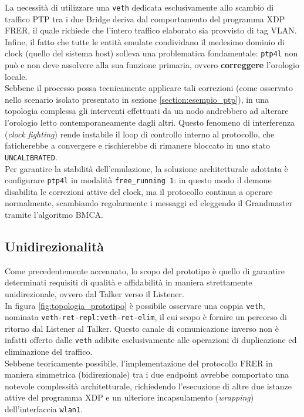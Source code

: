 \documentclass[12pt,a4paper,twoside]{book}
\begin{document}
\begin{onehalfspace}
La necessità di utilizzare una \texttt{veth} dedicata esclusivamente allo scambio di traffico PTP tra i due Bridge deriva dal comportamento del programma XDP FRER, il quale richiede che l'intero traffico elaborato sia provvisto di tag VLAN.
\\
Infine, il fatto che tutte le entità emulate condividano il medesimo dominio di clock (quello del sistema host) solleva una problematica fondamentale: \texttt{ptp4l} non può e non deve assolvere alla sua funzione primaria, ovvero \textbf{correggere} l'orologio locale. 
\\
Sebbene il processo possa tecnicamente applicare tali correzioni (come osservato nello scenario isolato presentato in sezione \ref{section:esempio_ptp}), in una topologia complessa gli interventi effettuati da un nodo andrebbero ad alterare l'orologio letto contemporaneamente dagli altri. Questo fenomeno di interferenza (\textit{clock fighting}) rende instabile il loop di controllo interno al protocollo, che faticherebbe a convergere e rischierebbe di rimanere bloccato in uno stato \texttt{UNCALIBRATED}. 
\\
Per garantire la stabilità dell'emulazione, la soluzione architetturale adottata è configurare \texttt{ptp4l} in modalità \texttt{free\_running 1}: in questo modo il demone disabilita le correzioni attive del clock, ma il protocollo continua a operare normalmente, scambiando regolarmente i messaggi ed eleggendo il Grandmaster tramite l'algoritmo BMCA.
\subsection{Unidirezionalità}
Come precedentemente accennato, lo scopo del prototipo è quello di garantire determinati requisiti di qualità e affidabilità in maniera strettamente unidirezionale, ovvero dal Talker verso il Listener.
\\
In figura \ref{fig:topologia_prototipo} è possibile osservare una coppia \texttt{veth}, nominata \texttt{veth\allowbreak-ret\allowbreak-repl\allowbreak:veth\allowbreak-ret\allowbreak-elim}, il cui scopo è fornire un percorso di ritorno dal Listener al Talker. Questo canale di comunicazione inverso non è infatti offerto dalle \texttt{veth} adibite esclusivamente alle operazioni di duplicazione ed eliminazione del traffico. 
\\
Sebbene teoricamente possibile, l'implementazione del protocollo FRER in maniera simmetrica (bidirezionale) tra i due endpoint avrebbe comportato una notevole complessità architetturale, richiedendo l'esecuzione di altre due istanze attive del programma XDP e un ulteriore incapsulamento (\textit{wrapping}) dell'interfaccia \texttt{wlan1}.


\end{onehalfspace}
\end{document}
